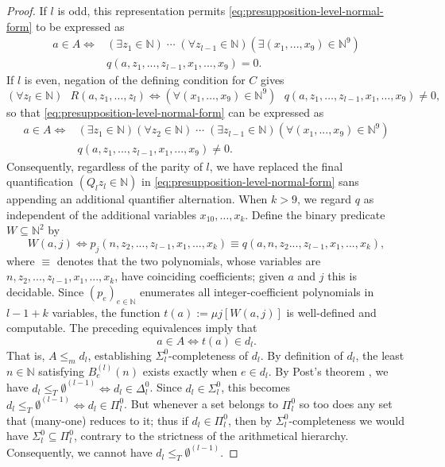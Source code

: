 \documentclass[10pt, a4paper, reqno]{amsart}
\numberwithin{equation}{section}
\renewcommand{\leq}{\leqslant}
\theoremstyle{definition}
\theoremstyle{definition}
\begin{document}
\begin{proof}
If $l$ is odd, this representation permits \eqref{eq:presupposition-level-normal-form} to be expressed as
\begin{equation*}
\begin{aligned}
a \in A \iff & (\exists z_1 \in \mathbb{N})\;\cdots\;(\forall z_{l-1} \in \mathbb{N}) (\exists (x_1, ..., x_9) \in \mathbb{N}^9) \\ & q(a, z_1, ..., z_{l-1}, x_1, ..., x_9) = 0.
\end{aligned}
 \end{equation*}
If $l$ is even, negation of the defining condition for $C$ gives
\[
    (\forall z_l \in \mathbb{N})\textrm{ }R(a,z_1,\ldots,z_l)
    \iff
    (\forall(x_1,\ldots,x_9)\in\mathbb N^9)\textrm{ }q(a,z_1,\ldots,z_{l-1},x_1,\ldots,x_9)\ne0,
\]
so that
\eqref{eq:presupposition-level-normal-form} can be expressed as
\begin{equation*}
\begin{aligned}
a \in A \iff  & (\exists z_1 \in \mathbb{N})(\forall z_2 \in \mathbb{N})\;\cdots\;(\exists z_{l-1} \in \mathbb{N}) (\forall (x_1, ..., x_9) \in \mathbb{N}^9) \\ & q(a, z_1, ..., z_{l-1}, x_1, ..., x_9) \neq 0.
\end{aligned}
\end{equation*}
Consequently, regardless of the parity of $l$, we have replaced the final quantification $(Q_l z_l \in \mathbb{N})$ in \eqref{eq:presupposition-level-normal-form} sans appending an additional quantifier alternation. When $k>9$, we regard $q$ as independent of the additional variables $x_{10},\ldots,x_k$.
Define the binary predicate $W \subseteq \mathbb{N}^2$ by
\begin{equation*}
W(a, j) \iff p_j(n, z_2, ..., z_{l-1}, x_1, ..., x_k) \equiv q(a, n, z_2 ..., z_{l-1}, x_{1}, ..., x_k),   
\end{equation*}
where $\equiv$ denotes that the two polynomials, whose variables are $n, z_2, ..., z_{l-1}, x_1, ..., x_k$, have coinciding coefficients; given $a$ and $j$ this is decidable.
Since $(p_e)_{e \in \mathbb{N}}$ enumerates all integer-coefficient polynomials in $l-1+k$ variables, the function $t(a) := \mu j [W(a, j)]$ is well-defined and computable.
The preceding equivalences imply that
\[
    a\in A\iff t(a)\in d_l.
\]
That is, $A\leq_m d_l$, establishing $\Sigma^0_l$-completeness of $d_l$.
By definition of $d_l$, the least $n \in \mathbb{N}$ satisfying $B^{(l)}_e(n)$ exists exactly when $e\in d_l$.
By Post's theorem \cite{Soare2016}, we have $d_l \leq_T \emptyset^{(l-1)} \iff d_l \in \Delta_{l}^{0}$. Since $d_l \in \Sigma_{l}^{0}$, this becomes $d_l \leq_T \emptyset^{(l-1)} \iff d_l \in \Pi_{l}^{0}$. But whenever a set belongs to $\Pi_{l}^{0}$ so too does any set that (many-one) reduces to it; thus if $d _l\in \Pi_{l}^{0}$, then by $\Sigma_{l}^{0}$-completeness we would have $\Sigma_{l}^{0} \subseteq \Pi_{l}^{0}$, contrary to the strictness of the arithmetical hierarchy. Consequently, we cannot have $d_l \leq_T \emptyset^{(l-1)}$.
\end{proof}
\end{document}
